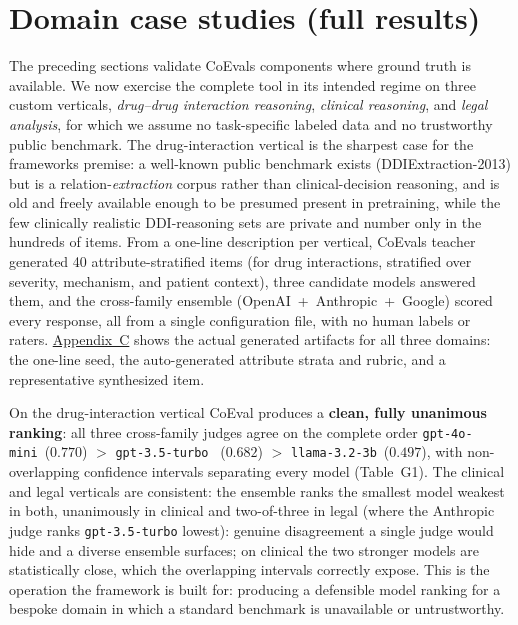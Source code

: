 \section{Domain case studies (full results)}\label{appG}

The preceding sections validate CoEval\textquotesingle s components where ground truth is available. We now exercise the complete tool
in its intended regime on three custom verticals, \emph{drug--drug interaction reasoning}, \emph{clinical
reasoning}, and \emph{legal analysis}, for which we assume no task-specific labeled data and no trustworthy
public benchmark. The drug-interaction vertical is the sharpest case for the framework\textquotesingle s premise: a well-known public
benchmark exists (DDIExtraction-2013) but is a relation-\emph{extraction} corpus rather than clinical-decision
reasoning, and is old and freely available enough to be presumed present in pretraining, while the few clinically
realistic DDI-reasoning sets are private and number only in the hundreds of items. From a one-line description per
vertical, CoEval\textquotesingle s teacher generated 40 attribute-stratified items (for drug interactions, stratified over severity,
mechanism, and patient context), three candidate models answered them, and the cross-family ensemble
(OpenAI~+~Anthropic~+~Google) scored every response, all from a single configuration file, with
no human labels or raters. \hyperref[appC]{Appendix~C} shows the actual generated artifacts for all three
domains: the one-line seed, the auto-generated attribute strata and rubric, and a representative synthesized item.

On the drug-interaction vertical CoEval produces a \textbf{clean, fully unanimous ranking}: all three
cross-family judges agree on the complete order \texttt{gpt-4o-mini}~(\(0.770\)) \(>\) \texttt{gpt-3.5-turbo}
~(\(0.682\)) \(>\) \texttt{llama-3.2-3b}~(\(0.497\)), with non-overlapping confidence intervals separating every
model (Table~G1). The clinical and legal verticals are consistent: the ensemble ranks the smallest model weakest in
both, unanimously in clinical and two-of-three in legal (where the Anthropic judge ranks \texttt{gpt-3.5-turbo}
lowest): genuine disagreement a single judge would hide and a diverse ensemble surfaces; on clinical the two
stronger models are statistically close, which the overlapping intervals correctly expose. This is the operation the
framework is built for: producing a defensible model ranking for a bespoke domain in which a standard benchmark is
unavailable or untrustworthy.

